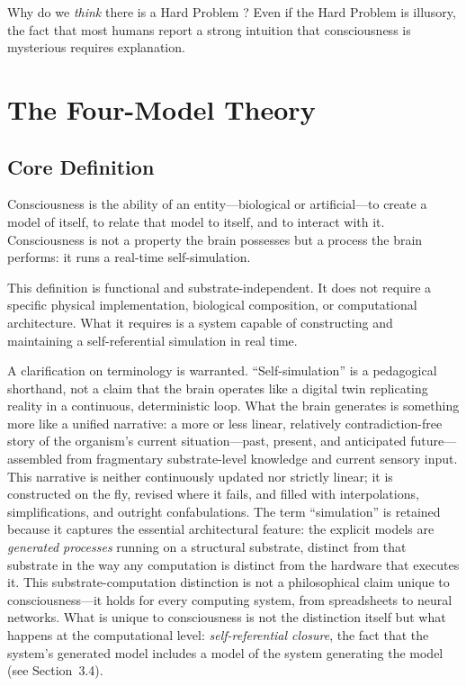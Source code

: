 \documentclass[12pt]{article}
\begin{document}
Why do we \emph{think} there is a Hard Problem \citep{Chalmers2018}? Even if the Hard Problem is illusory, the fact that most humans report a strong intuition that consciousness is mysterious requires explanation.



\section{The Four-Model Theory}


\subsection{Core Definition}

Consciousness is the ability of an entity---\hspace{0pt}biological or artificial---\hspace{0pt}to create a model of itself, to relate that model to itself, and to interact with it. Consciousness is not a property the brain possesses but a process the brain performs: it runs a real-time self-simulation.

This definition is functional and substrate-independent. It does not require a specific physical implementation, biological composition, or computational architecture. What it requires is a system capable of constructing and maintaining a self-referential simulation in real time.

A clarification on terminology is warranted. ``Self-simulation'' is a pedagogical shorthand, not a claim that the brain operates like a digital twin replicating reality in a continuous, deterministic loop. What the brain generates is something more like a unified narrative: a more or less linear, relatively contradiction-free story of the organism's current situation---\hspace{0pt}past, present, and anticipated future---\hspace{0pt}assembled from fragmentary substrate-level knowledge and current sensory input. This narrative is neither continuously updated nor strictly linear; it is constructed on the fly, revised where it fails, and filled with interpolations, simplifications, and outright confabulations. The term ``simulation'' is retained because it captures the essential architectural feature: the explicit models are \emph{generated processes} running on a structural substrate, distinct from that substrate in the way any computation is distinct from the hardware that executes it. This substrate-computation distinction is not a philosophical claim unique to consciousness---\hspace{0pt}it holds for every computing system, from spreadsheets to neural networks. What is unique to consciousness is not the distinction itself but what happens at the computational level: \emph{self-referential closure}, the fact that the system's generated model includes a model of the system generating the model (see Section~3.4).
\end{document}
